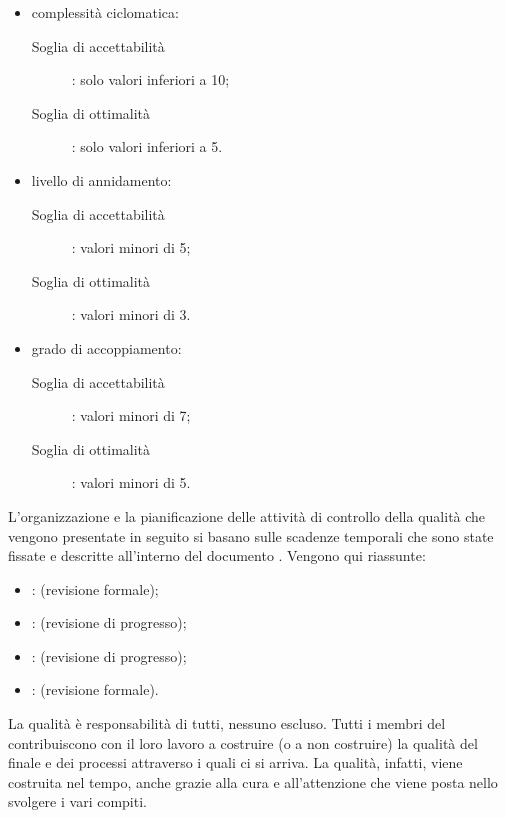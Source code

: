 					\begin{itemize}
						\item complessità ciclomatica:
						\begin{description}
							\item[Soglia di accettabilità]: solo valori inferiori a 10;
							\item[Soglia di ottimalità]: solo valori inferiori a 5.
						\end{description}
						\item livello di annidamento:
						\begin{description}
							\item[Soglia di accettabilità]: valori minori di 5;
							\item[Soglia di ottimalità]: valori minori di 3.
						\end{description}
						\item grado di accoppiamento:
						\begin{description}
							\item[Soglia di accettabilità]: valori minori di 7;
							\item[Soglia di ottimalità]: valori minori di 5.
						\end{description}
					\end{itemize}
		L'organizzazione e la pianificazione delle attività di controllo della qualità che vengono presentate in seguito si basano sulle scadenze temporali che sono state fissate e descritte all'interno del documento . Vengono qui riassunte:
		\begin{itemize}
			\item {}:  (revisione formale);
			\item {}:  (revisione di progresso);
			\item {}:  (revisione di progresso);
			\item {}:  (revisione formale).
		\end{itemize}
	 \label{subsec:responsabilita}
		La qualità è responsabilità di tutti, nessuno escluso. Tutti i membri del  contribuiscono con il loro lavoro a costruire (o a non costruire) la qualità del  finale e dei processi attraverso i quali ci si arriva. La qualità, infatti, viene costruita nel tempo, anche grazie alla cura e all'attenzione che viene posta nello svolgere i vari compiti. \\
